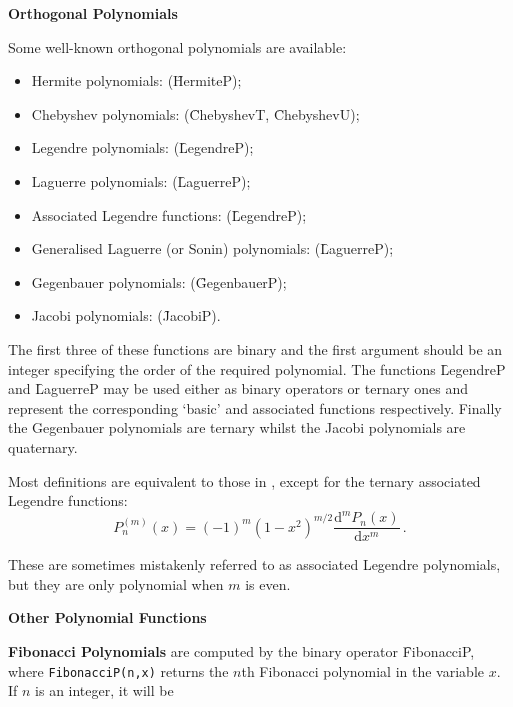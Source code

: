 \textbf{Orthogonal Polynomials}
 

Some well-known orthogonal polynomials are available:
\begin{itemize}
\item Hermite polynomials: (\f{HermiteP});
\item Chebyshev polynomials: (\f{ChebyshevT}, \f{ChebyshevU});
\item Legendre polynomials: (\f{LegendreP});
\item Laguerre polynomials: (\f{LaguerreP});
\item Associated Legendre functions: (\f{LegendreP});
\item Generalised Laguerre (or Sonin) polynomials: (\f{LaguerreP});
\item Gegenbauer polynomials: (\f{GegenbauerP});
\item Jacobi polynomials: (\f{JacobiP}).
\end{itemize}
The first three of these functions are binary and the first
argument should be an integer specifying the order of the
required polynomial. The functions \f{LegendreP} and \f{LaguerreP} may be used
either as binary operators or ternary ones and represent the corresponding
`basic' and associated functions respectively.
Finally the Gegenbauer polynomials are ternary whilst the Jacobi polynomials
are quaternary.

Most definitions are equivalent to those in \cite{AbramowitzStegun:72},
except for the ternary associated Legendre functions:
\[P_n^{(m)}(x) = (-1)^m(1-x^2)^{m/2}\frac{\mathrm{d}^m P_n(x)}{\mathrm{d}x^m}\,.\]

These are sometimes mistakenly referred to as associated Legendre polynomials,
but they are only polynomial when $m$ is even.

\textbf{Other Polynomial Functions}
\hypertarget{operator:FIBONACCIP}{}

\textbf{Fibonacci Polynomials} are computed by the binary operator
\f{FibonacciP}, where
\texttt{FibonacciP(n,x)} returns the $n$th Fibonacci polynomial
in the variable $x$. If $n$ is an integer, it will be


